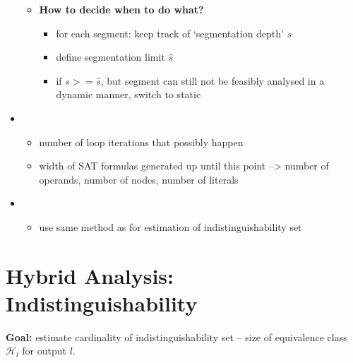 \begin{itemize}
\begin{itemize}
        \item \textbf{How to decide when to do what?}
        \begin{itemize}
            \item for each segment: keep track of `segmentation depth' $s$
            \item define segmentation limit $\hat{s}$
            \item if $s >= \hat{s}$, but segment can still not be feasibly analysed in a dynamic manner, switch to static 
        \end{itemize}
    \end{itemize}
    
    
    \item {}
    \begin{itemize}
        \item number of loop iterations that possibly happen
        \item width of SAT formulas generated up until this point --> number of operands, number of nodes, number of literals
        
    \end{itemize}
     \item {}
    \begin{itemize}
        \item use same method as for estimation of indistinguishability set
    \end{itemize}
    
\end{itemize}


\section{Hybrid Analysis: Indistinguishability}

\textbf{Goal: }estimate cardinality of indistinguishability set -- size of equivalence class $\mathcal{H}_l$ for output $l$.

